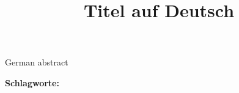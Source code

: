 \title{Titel auf Deutsch} 

 \label{zusammenfassung} 

\vspace{-7mm}
German abstract

\vspace{-2mm}


\noindent\textbf{Schlagworte:} 




